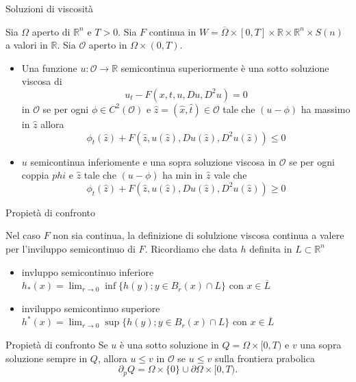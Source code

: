\begin{frame}{Soluzioni di viscosità}
  \begin{definizione}
    Sia $\Omega$ aperto di $\mathbb{R}^n$ e $T>0$. Sia $F$ continua in
    $W=\overline{\Omega}\times
    [0,T]\times\mathbb{R}\times\mathbb{R}^n\times S(n)$ a valori in
    $\mathbb{R}$. Sia $\mathcal{O}$ aperto in $\Omega\times(0,T)$.
    \begin{itemize}
      \item Una funzione $u:\mathcal{O}\to\mathbb{R}$ semicontinua
        superiormente è una \alert{sotto
          soluzione viscosa} di 
        \[
        u_t-F(x,t,u,Du,D^2u)=0
        \]
        in $\mathcal{O}$ se per ogni $\phi\in C^2(\mathcal{O})$ e
        $\hat{z}=(\hat{x},\hat{t})\in\mathcal{O}$ tale che $(u-\phi)$ ha
        massimo in $\hat{z}$ allora
        \[
        \phi_t(\hat{z})+F(\hat{z},u(\hat{z}),Du(\hat{z}),D^2u(\hat{z}))\leq 0
        \]
        \item $u$ semicontinua inferiomente e una \alert{sopra
          soluzione viscosa}  in $\mathcal{O}$ se per ogni coppia
          $phi$ e $\hat{z}$ tale che $(u-\phi)$ ha min in $\hat{z}$
          vale che
          \[
          \phi_t(\hat{z})+F(\hat{z},u(\hat{z}),Du(\hat{z}),D^2u(\hat{z}))\geq 0
          \]
        \end{itemize}
  \end{definizione}
\end{frame}
\begin{frame}{Propietà di confronto}
  \begin{osservazione}
    Nel caso $F$ non sia continua, la definizione di solulzione
    viscosa continua a valere per l'inviluppo semicontinuo di
    $F$. Ricordiamo che data $h$ definita in $L\subset\mathbb{R}^n$
    \begin{itemize}
    \item  invluppo semicontinuo inferiore $h_*(x)=\lim_{r\to
      0}\inf\{h(y); y\in B_r(x)\cap L\}$ con $x\in\overline{L}$
    \item inviluppo semicontinuo superiore $h^*(x)=\lim_{r\to
      0}\sup\{h(y);y\in B_r(x)\cap L\}$ con $x\in\overline{L}$
    \end{itemize}
  \end{osservazione}
  \begin{block}{Propietà di confronto}
    Se $u$ è una sotto soluzione in $Q=\Omega\times[0,T)$ e
      $v$ una sopra  soluzione sempre in $Q$,  allora $u\leq
      v$ in $\mathcal{O}$ se $u\leq v$ sulla frontiera prabolica 
    \[
    \partial_pQ=\Omega\times\{0\}\cup\partial\Omega\times[0,T).
    \]
  \end{block}
\end{frame}
